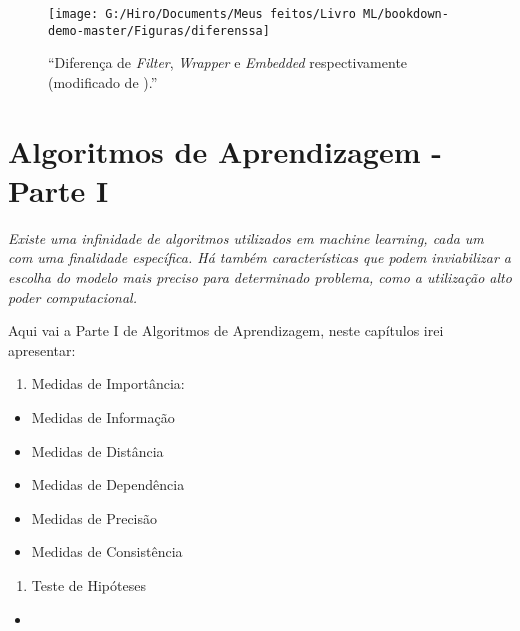 \documentclass[
]{book}
\providecommand{\tightlist}{%
  \setlength{\itemsep}{0pt}\setlength{\parskip}{0pt}}
\begin{document}
\begin{figure}

{\centering \texttt{[image: G:/Hiro/Documents/Meus feitos/Livro ML/bookdown-demo-master/Figuras/diferenssa]} 

}

\caption{``Diferença de \emph{Filter}, \emph{Wrapper} e \emph{Embedded} respectivamente (modificado de \citet{covoes2010seleccao}).''}\label{fig:diferenssa}
\end{figure}



\hypertarget{Algoritmosaprendizagem}{%
\chapter{Algoritmos de Aprendizagem - Parte I}\label{Algoritmosaprendizagem}}

\emph{Existe uma infinidade de algoritmos utilizados em machine learning, cada um com uma finalidade específica. Há também características que podem inviabilizar a escolha do modelo mais preciso para determinado problema, como a utilização alto poder computacional.}

Aqui vai a Parte I de Algoritmos de Aprendizagem, neste capítulos irei apresentar:

\begin{enumerate}
\def\labelenumi{\arabic{enumi}.}
\tightlist
\item
  Medidas de Importância:
\end{enumerate}

\begin{itemize}
\tightlist
\item
  Medidas de Informação
\item
  Medidas de Distância
\item
  Medidas de Dependência
\item
  Medidas de Precisão
\item
  Medidas de Consistência
\end{itemize}

\begin{enumerate}
\def\labelenumi{\arabic{enumi}.}
\setcounter{enumi}{1}
\tightlist
\item
  Teste de Hipóteses
\end{enumerate}

\begin{itemize}
\item
\end{itemize}
\end{document}
